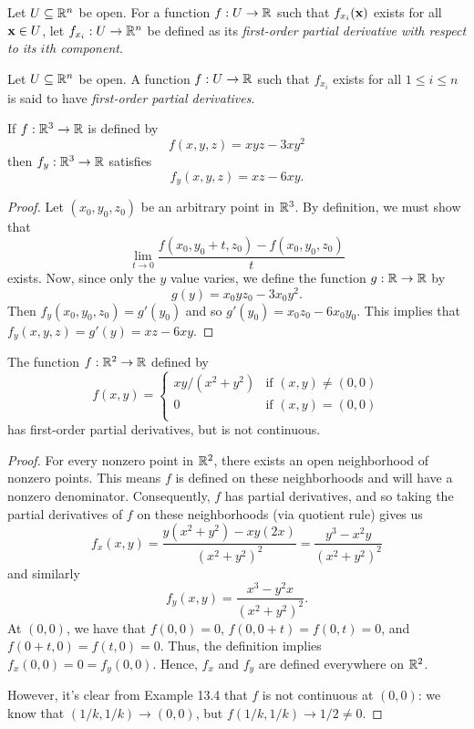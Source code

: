 \documentclass[letterpaper, twoside, 12pt]{book}
\begin{document}
\begin{definition}
  Let \(U\subseteq\mathbb R^n\) be open. For a function
  \(f:U\to\mathbb R\) such that \(f_{x_i}(\mathbf x)\) exists for all \(\mathbf x\in U\),
  let \(f_{x_i}:U\to\mathbb R^n\) be defined as its
  \textit{first-order partial derivative with respect to
  its \(i\)th component}.
\end{definition}

\begin{definition}
  Let \(U\subseteq\mathbb R^n\) be open. A function
  \(f:U\to\mathbb R\) such that \(f_{x_i}\) exists for all \(1\leq i\leq n\) is said
  to have \textit{first-order partial derivatives}.
\end{definition}

\begin{example}[13.8*]
  If \(f:\mathbb R^3\to\mathbb R\) is defined by
  \[
    f(x,y,z)=xyz-3xy^2
  \]
  then \(f_y:\mathbb R^3\to\mathbb R\) satisfies
  \[
    f_y(x,y,z)=xz-6xy
  .\]
\end{example}

\begin{proof}
    Let \((x_0, y_0, z_0)\) be an arbitrary point in \(\mathbb R^3\). 
    By definition, we must show that
    \[ \lim_{t \to 0} \frac{f(x_0, y_0 + t, z_0) - f(x_0, y_0, z_0)}{t} \]
    exists. Now, since only the \(y\) value varies, we define the
    function \(g: \mathbb R \to \mathbb R\) by \[g(y) = x_0yz_0 - 3x_0y^2. \]
    Then \(f_y(x_0, y_0, z_0) = g'(y_0)\) and so
    \(g'(y_0) = x_0z_0 - 6x_0y_0\). This implies that
    \(f_y(x,y,z) = g'(y) = xz - 6xy\).
\end{proof}

\begin{example}[13.9]
  The function \(f:\mathbb R^2\to\mathbb R\) defined by
  \[
    f(x,y) = \begin{cases}
      xy/(x^2+y^2) & \text{if } (x,y)\not=(0,0) \\
      0 & \text{if } (x,y)=(0,0) \\
    \end{cases}
  \]
  has first-order partial derivatives, but is not continuous.
\end{example}

\begin{proof}
    For every nonzero point in \(\mathbb R^2\), there exists an open
    neighborhood of nonzero points. This means \(f\) is defined
    on these neighborhoods and will have a nonzero denominator.
    Consequently, \(f\) has partial derivatives, and so taking
    the partial derivatives of \(f\) on these neighborhoods 
    (via quotient rule) gives us
    \[ f_x(x, y) = \frac{ y(x^2 + y^2) - xy(2x)}{ (x^2 + y^2)^2 } 
    = \frac{ y^3 - x^2 y}{ (x^2 + y^2)^2} \]
    and similarly
    \[ f_y(x, y) = \frac{ x^3 - y^2 x}{ (x^2 + y^2)^2 } .\]
    At \((0, 0)\), we have that \(f(0, 0) = 0\),
    \(f(0, 0 + t) = f(0, t) = 0\), and \(f(0 + t, 0) = f(t, 0) = 0\).
    Thus, the definition implies \(f_x(0,0) = 0 = f_y(0,0)\). Hence,
    \(f_x\) and \(f_y\) are defined everywhere on \(\mathbb R^2\).

    However, it's clear from Example 13.4 that \(f\) is not
    continuous at \((0,0)\): we know that \((1/k, 1/k) \to (0,0)\),
    but \(f(1/k, 1/k) \to 1/2 \neq 0\).
\end{proof}
\end{document}

